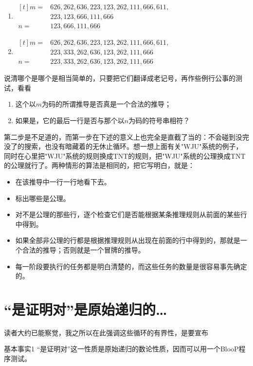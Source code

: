 \begin{enumerate}
\item $\begin{aligned}[t]
  m={}&626, 262, 636, 223, 123, 262, 111, 666, 611,\\
      &223, 123, 666, 111, 666\\
  n={}&123, 666, 111, 666
\end{aligned}$
\item $\begin{aligned}[t]
  m={}&626, 262, 636, 223, 123, 262, 111, 666, 611,\\
      &223, 333, 262, 636, 123, 262, 111, 666\\
  n={}&223, 333, 262, 636, 123, 262, 111, 666
\end{aligned}$
\end{enumerate}
说清哪个是哪个是相当简单的，只要把它们翻译成老记号，再作些例行公事的测试，看看
\begin{enumerate}
\item 这个以$m$为码的所谓推导是否真是一个合法的推导；
\item 如果是，它的最后一行是否与那个以$n$为码的符号串相符？
\end{enumerate}
第二步是不足道的，而第一步在下述的意义上也完全是直截了当的：不会碰到没完没了的搜索，也没有暗藏着的无休止循环。想一想上面有关"WJU"系统的例子，同时在心里把"WJU"系统的规则换成TNT的规则，把"WJU"系统的公理换成TNT的公理就行了。两种情形的算法是相同的，把它写明白，就是：
\begin{itemize}
\item 在该推导中一行一行地看下去。
\item 标出哪些是公理。
\item 对不是公理的那些行，逐个检查它们是否能根据某条推理规则从前面的某些行中得到。
\item 如果全部非公理的行都是根据推理规则从出现在前面的行中得到的，那就是一个合法的推导；否则就是一个冒牌的推导。
\item 每一阶段要执行的任务都是明白清楚的，而这些任务的数量是很容易事先确定的。
\end{itemize}

\section{“是证明对”是原始递归的…}

读者大约已能察觉，我之所以在此强调这些循环的有界性，是要宣布

\begin{thm}{基本事实1}
“是证明对”这一性质是原始递归的数论性质，因而可以用一个BlooP程序测试。
\end{thm}

